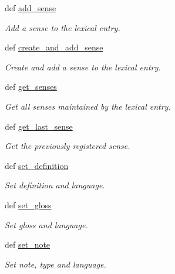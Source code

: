 \begin{DoxyCompactItemize}
def \hyperlink{classlmf_1_1src_1_1core_1_1lexical__entry_1_1_lexical_entry_a4aef3989f5793f9ef330cbca51b77520}{add\+\_\+sense}
\begin{DoxyCompactList}\small\item\em Add a sense to the lexical entry. \end{DoxyCompactList}\item 
def \hyperlink{classlmf_1_1src_1_1core_1_1lexical__entry_1_1_lexical_entry_a6a3c981f673e000f25b0be3df42b53f2}{create\+\_\+and\+\_\+add\+\_\+sense}
\begin{DoxyCompactList}\small\item\em Create and add a sense to the lexical entry. \end{DoxyCompactList}\item 
def \hyperlink{classlmf_1_1src_1_1core_1_1lexical__entry_1_1_lexical_entry_a00e6fd296669f34f047b3502bebd6a90}{get\+\_\+senses}
\begin{DoxyCompactList}\small\item\em Get all senses maintained by the lexical entry. \end{DoxyCompactList}\item 
def \hyperlink{classlmf_1_1src_1_1core_1_1lexical__entry_1_1_lexical_entry_a50334b78f54e0ad7a2bedbc7d5bf821f}{get\+\_\+last\+\_\+sense}
\begin{DoxyCompactList}\small\item\em Get the previously registered sense. \end{DoxyCompactList}\item 
def \hyperlink{classlmf_1_1src_1_1core_1_1lexical__entry_1_1_lexical_entry_aaf135ff72cc9f20358208e733c3a0ffb}{set\+\_\+definition}
\begin{DoxyCompactList}\small\item\em Set definition and language. \end{DoxyCompactList}\item 
def \hyperlink{classlmf_1_1src_1_1core_1_1lexical__entry_1_1_lexical_entry_ab83d1cb6142baa7a1914db467f63121f}{set\+\_\+gloss}
\begin{DoxyCompactList}\small\item\em Set gloss and language. \end{DoxyCompactList}\item 
def \hyperlink{classlmf_1_1src_1_1core_1_1lexical__entry_1_1_lexical_entry_a5efc30f6a6e8bb9b761ece95523719df}{set\+\_\+note}
\begin{DoxyCompactList}\small\item\em Set note, type and language. \end{DoxyCompactList}\item 

\end{DoxyCompactItemize}
